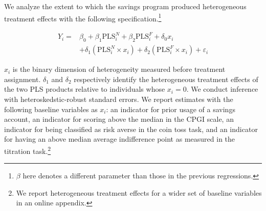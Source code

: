 \documentclass[12pt]{article}
\begin{document}
		We analyze the extent to which the savings program produced heterogeneous treatment effects with the following specification.\footnote{$\beta$ here denotes a different parameter than those in the previous regressions.}

		\begin{equation} \begin{split}
		Y_{i} = & \beta_{0} + \beta_{1}\text{PLS}^{N}_{i} + \beta_{2}\text{PLS}^{F}_{i} + \delta_{0}x_{i} \\
					& + \delta_{1}(\text{PLS}^{N}_{i} \times x_{i}) + \delta_{2}(\text{PLS}^{F}_{i} \times x_{i}) + \varepsilon_{i}
		\end{split} \label{eq:heteffect} \end{equation}

		$x_{i}$ is the binary dimension of heterogeneity measured before treatment assignment. $\delta_{1}$ and $\delta_{2}$ respectively identify the heterogeneous treatment effects of the two PLS products relative to individuals whose $x_{i} = 0$. We conduct inference with heteroskedstic-robust standard errors. We report estimates with the following baseline variables as $x_{i}$: an indicator for prior usage of a savings account, an indicator for scoring above the median in the CPGI scale, an indicator for being classified as risk averse in the coin toss task, and an indicator for having an above median average indifference point as measured in the titration task.\footnote{We report heterogeneous treatment effects for a wider set of baseline variables in an online appendix.}
\end{document}
